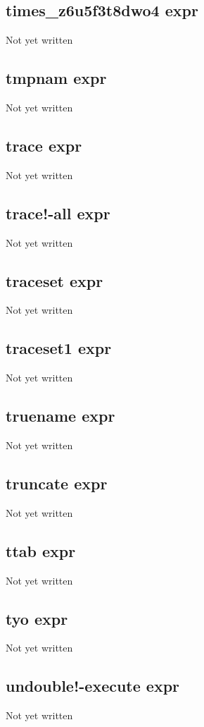 \documentclass[a4paper,11pt]{article}
\begin{document}
\subsection{\ttfamily times\_z6u5f3t8dwo4 expr}
Not yet written

\subsection{\ttfamily tmpnam expr}
Not yet written

\subsection{\ttfamily trace expr}
Not yet written

\subsection{\ttfamily trace!-all expr}
Not yet written

\subsection{\ttfamily traceset expr}
Not yet written

\subsection{\ttfamily traceset1 expr}
Not yet written

\subsection{\ttfamily truename expr}
Not yet written

\subsection{\ttfamily truncate expr}
Not yet written

\subsection{\ttfamily ttab expr}
Not yet written

\subsection{\ttfamily tyo expr}
Not yet written

\subsection{\ttfamily undouble!-execute expr}
Not yet written
\end{document}
